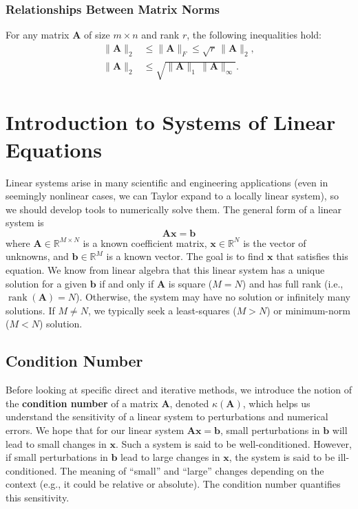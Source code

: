 \subsubsection{Relationships Between Matrix Norms}
For any matrix $ \mathbf{A} $ of size $ m \times n $ and rank $ r $, the following inequalities hold:
\begin{align*}
    \|\mathbf{A}\|_2 &\leq \|\mathbf{A}\|_F \leq \sqrt{r}\,\|\mathbf{A}\|_2, \\
    \|\mathbf{A}\|_2 &\leq \sqrt{\|\mathbf{A}\|_1 \, \|\mathbf{A}\|_\infty}.
\end{align*}

\section{Introduction to Systems of Linear Equations}
Linear systems arise in many scientific and engineering applications (even in seemingly nonlinear cases, we can Taylor expand to a locally linear system), so we should develop tools to numerically solve them. The general form of a linear system is
\begin{equation}
    \mathbf{A}\mathbf{x} = \mathbf{b}
    \label{eq:linear-system}
\end{equation}
where $ \mathbf{A} \in \mathbb{R}^{M \times N} $ is a known coefficient matrix, $ \mathbf{x} \in \mathbb{R}^N $ is the vector of unknowns, and $ \mathbf{b} \in \mathbb{R}^M $ is a known vector. The goal is to find $ \mathbf{x} $ that satisfies this equation. We know from linear algebra that this linear system has a unique solution for a given $\mathbf{b}$ if and only if $ \mathbf{A} $ is square ($M=N$) and has full rank (i.e., $\operatorname{rank}(\mathbf{A})=N$). Otherwise, the system may have no solution or infinitely many solutions. If $M\ne N$, we typically seek a least-squares ($M>N$) or minimum-norm ($M<N$) solution.


\subsection{Condition Number}
Before looking at specific direct and iterative methods, we introduce the notion of the \textbf{condition number} of a matrix $\mathbf{A}$, denoted $\kappa(\mathbf{A})$, which helps us understand the sensitivity of a linear system to perturbations and numerical errors. We hope that for our linear system $\mathbf{A}\mathbf{x} = \mathbf{b}$, small perturbations in $\mathbf{b}$ will lead to small changes in $\mathbf{x}$. Such a system is said to be well-conditioned. However, if small perturbations in $\mathbf{b}$ lead to large changes in $\mathbf{x}$, the system is said to be ill-conditioned. The meaning of ``small'' and ``large'' changes depending on the context (e.g., it could be relative or absolute). The condition number quantifies this sensitivity.

